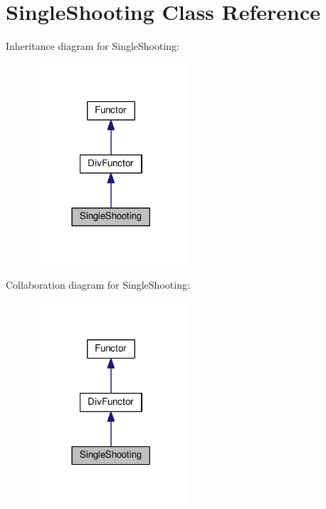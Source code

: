 \hypertarget{classSingleShooting}{}\section{Single\+Shooting Class Reference}
\label{classSingleShooting}


Inheritance diagram for Single\+Shooting\+:\nopagebreak
\begin{figure}[H]
\begin{center}
\leavevmode
\includegraphics[width=162pt]{classSingleShooting__inherit__graph}
\end{center}
\end{figure}


Collaboration diagram for Single\+Shooting\+:\nopagebreak
\begin{figure}[H]
\begin{center}
\leavevmode
\includegraphics[width=162pt]{classSingleShooting__coll__graph}
\end{center}
\end{figure}
